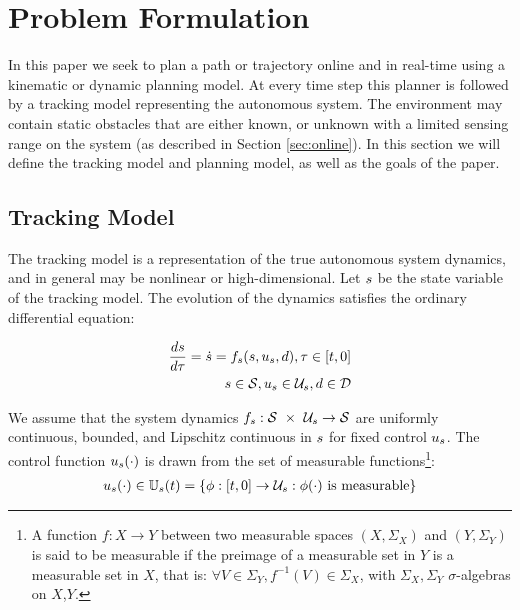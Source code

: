 \section{Problem Formulation \label{sec:formulation}}
In this paper we seek to plan a path or trajectory online and in real-time using a kinematic or dynamic planning model. At every time step this planner is followed by a tracking model representing the autonomous system. The environment may contain static obstacles that are either known, or unknown with a limited sensing range on the system (as described in Section \ref{sec:online}). In this section we will define the tracking model and planning model, as well as the goals of the paper.

\subsection{Tracking Model}
The tracking model is a representation of the true autonomous system dynamics, and in general may be nonlinear or high-dimensional. Let $s$ be the state variable of the tracking model. The evolution of the dynamics satisfies the ordinary differential equation:

\begin{equation}
\begin{aligned}
\label{eq:tdyn}
\frac{ds}{d\tau} = \dot{s} = f_s(s, u_s, d), \tau \in [t, 0] \\
s \in \mathcal{S}, u_s \in \mathcal{U}_s, d \in \mathcal{D}
\end{aligned}
\end{equation}

We assume that the system dynamics $f_s : \mathcal{S}\ \times\ \mathcal{U}_s \rightarrow \mathcal{S}$ are uniformly continuous, bounded, and Lipschitz continuous in $s$ for fixed control $u_s$. The control function $u_s(\cdot)$ is drawn from the set of measurable functions\footnote{A function $f:X\to Y$ between two measurable spaces $(X,\Sigma_X)$ and $(Y,\Sigma_Y)$ is said to be measurable if the preimage of a measurable set in $Y$ is a measurable set in $X$, that is: $\forall V\in\Sigma_Y, f^{-1}(V)\in\Sigma_X$, with $\Sigma_X,\Sigma_Y$ $\sigma$-algebras on $X$,$Y$.}:
\begin{equation}
\begin{aligned}
u_s(\cdot) \in \mathbb{U}_s(t) = \{\phi: [t, 0] \rightarrow \mathcal{U}_s: \phi(\cdot) \text{ is measurable}\}
\end{aligned}
\end{equation}

